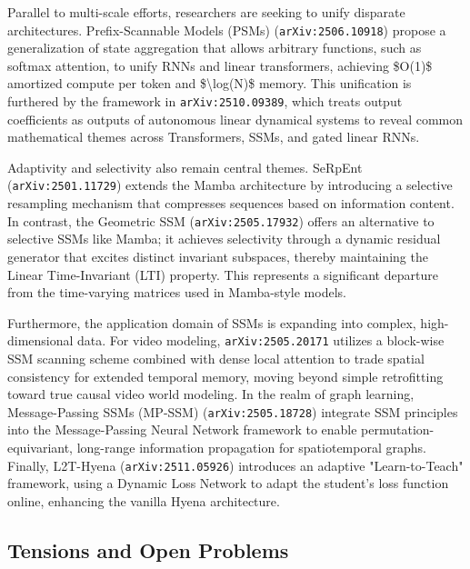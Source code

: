\documentclass[11pt]{article}
\begin{document}
Parallel to multi-scale efforts, researchers are seeking to unify disparate architectures. Prefix-Scannable Models (PSMs) (\texttt{arXiv:2506.10918}) propose a generalization of state aggregation that allows arbitrary functions, such as softmax attention, to unify RNNs and linear transformers, achieving \$O(1)\$ amortized compute per token and \$\textbackslash{}log(N)\$ memory. This unification is furthered by the framework in \texttt{arXiv:2510.09389}, which treats output coefficients as outputs of autonomous linear dynamical systems to reveal common mathematical themes across Transformers, SSMs, and gated linear RNNs.

Adaptivity and selectivity also remain central themes. SeRpEnt (\texttt{arXiv:2501.11729}) extends the Mamba architecture by introducing a selective resampling mechanism that compresses sequences based on information content. In contrast, the Geometric SSM (\texttt{arXiv:2505.17932}) offers an alternative to selective SSMs like Mamba; it achieves selectivity through a dynamic residual generator that excites distinct invariant subspaces, thereby maintaining the Linear Time-Invariant (LTI) property. This represents a significant departure from the time-varying matrices used in Mamba-style models.

Furthermore, the application domain of SSMs is expanding into complex, high-dimensional data. For video modeling, \texttt{arXiv:2505.20171} utilizes a block-wise SSM scanning scheme combined with dense local attention to trade spatial consistency for extended temporal memory, moving beyond simple retrofitting toward true causal video world modeling. In the realm of graph learning, Message-Passing SSMs (MP-SSM) (\texttt{arXiv:2505.18728}) integrate SSM principles into the Message-Passing Neural Network framework to enable permutation-equivariant, long-range information propagation for spatiotemporal graphs. Finally, L2T-Hyena (\texttt{arXiv:2511.05926}) introduces an adaptive "Learn-to-Teach" framework, using a Dynamic Loss Network to adapt the student's loss function online, enhancing the vanilla Hyena architecture.

\subsection{Tensions and Open Problems}
\end{document}
